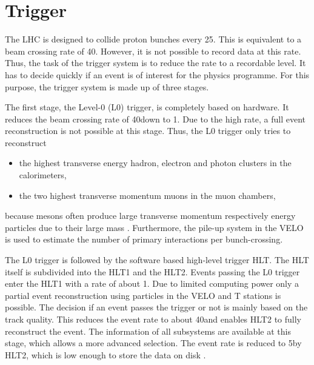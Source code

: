\section{Trigger}
The LHC is designed to collide proton bunches every 25\ns.
This is equivalent to a beam crossing rate of 40\mhz.
However, it is not possible to record data at this rate.
Thus, the task of the \lhcb trigger system is to reduce the rate to a recordable level.
It has to decide quickly if an event is of interest for the \lhcb physics programme.
For this purpose, the trigger system is made up of three stages.

The first stage, the Level-0 (L0) trigger, is completely based on hardware.
It reduces the beam crossing rate of 40\mhz down to 1\mhz.
Due to the high rate, a full event reconstruction is not possible at this stage.
Thus, the L0 trigger only tries to reconstruct
\begin{itemize}
    \item the highest transverse energy \et hadron, electron and photon clusters in the calorimeters,
    \item the two highest transverse momentum muons in the muon chambers,
\end{itemize}
because \B mesons often produce large transverse momentum respectively energy particles due to their large mass \cite{detector}.
Furthermore, the pile-up system in the VELO is used to estimate the number of primary \proton\proton interactions per bunch-crossing.

The L0 trigger is followed by the software based high-level trigger HLT.
The HLT itself is subdivided into the HLT1 and the HLT2.
Events passing the L0 trigger enter the HLT1 with a rate of about 1\mhz.
Due to limited computing power only a partial event reconstruction using particles in the VELO and T stations is possible.
The decision if an event passes the trigger or not is mainly based on the track quality.
This reduces the event rate to about 40\khz and enables HLT2 to fully reconstruct the event.
The information of all \lhcb subsystems are available at this stage, which allows a more advanced selection.
The event rate is reduced to 5\khz by HLT2, which is low enough to store the data on disk \cite{detector, Trigger, Trigger_Performance_2011}.

